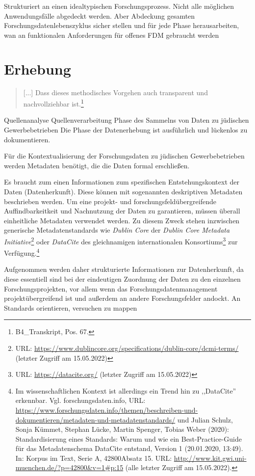 Strukturiert an einen idealtypischen Forschungsprozess. Nicht alle möglichen Anwendungsfälle abgedeckt werden. Aber Abdeckung gesamten Forschungsdatenlebenszyklus sicher stellen und für jede Phase herausarbeiten, wan an funktionalen Anforderungen für offenes FDM gebraucht werden
\section{Erhebung}

\begin{quote}
    [...] Dass dieses methodisches Vorgehen auch transparent und nachvollziehbar ist.\footnote{B4\_Transkript, Pos. 67.}
\end{quote}

Quellenanalyse Quellenverarbeitung Phase des Sammelns von Daten zu jüdischen Gewerbebetrieben
Die Phase der Datenerhebung ist ausführlich und lückenlos zu dokumentieren.

Für die Kontextualisierung der Forschungsdaten zu jüdischen Gewerbebetrieben werden Metadaten benötigt, die die Daten formal erschließen. 


Es braucht zum einen Informationen zum spezifischen Entstehungskontext der Daten (Datenherkunft). Diese können mit sogenannten deskriptiven Metadaten beschrieben werden. Um eine projekt- und forschungsfeldübergreifende Auffindbarkeitkeit und Nachnutzung der Daten zu garantieren, müssen überall einheitliche Metadaten verwendet werden. Zu diesem Zweck stehen inzwischen generische Metadatenstandards wie \textit{Dublin Core} der \textit{Dublin Core Metadata Initiative}\footnote{URL: \url{https://www.dublincore.org/specifications/dublin-core/dcmi-terms/} (letzter Zugriff am 15.05.2022)} oder \textit{DataCite} des gleichnamigen internationalen Konsortiums\footnote{URL: \url{https://datacite.org/} (letzter Zugriff am 15.05.2022)} zur Verfügung.\footnote{Im wissenschaftlichen Kontext ist allerdings ein Trend hin zu ,,DataCite'' erkennbar. Vgl. forschungsdaten.info, URL: \url{https://www.forschungsdaten.info/themen/beschreiben-und-dokumentieren/metadaten-und-metadatenstandards/} und Julian Schulz, Sonja Kümmet, Stephan Lücke, Martin Spenger, Tobias Weber (2020): Standardisierung eines Standards: Warum und wie ein Best-Practice-Guide für das Metadatenschema DataCite entstand, Version 1 (20.01.2020, 13:49). In: Korpus im Text, Serie A, 42800Absatz 15. URL: \url{http://www.kit.gwi.uni-muenchen.de/?p=42800&v=1\#p:15} (alle letzter Zugriff am 15.05.2022).}

Aufgenommen werden daher strukturierte Informationen zur Datenherkunft, da diese essentiell sind bei der eindeutigen Zuordnung der Daten zu den einzelnen Forschungsprojekten, vor allem wenn das Forschungsdatenmanagement projektübergreifend ist und außerdem an andere Forschungsfelder andockt. An Standards orientieren, versuchen zu mappen

